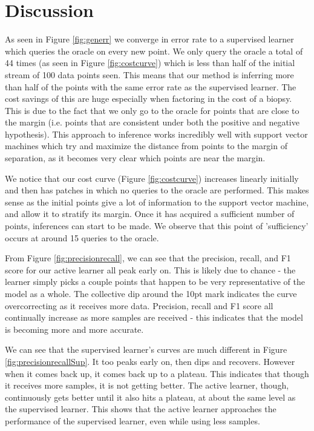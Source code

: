 \documentclass[12pt]{article}
\begin{document}
\section{Discussion}
As seen in Figure \ref{fig:generr} we converge in error rate to a supervised learner which queries the oracle on every new point. We only query the oracle a total of 44 times (as seen in Figure \ref{fig:costcurve}) which is less than half of the initial stream of 100 data points seen. This means that our method is inferring more than half of the points with the same error rate as the supervised learner. The cost savings of this are huge especially when factoring in the cost of a biopsy. This is due to the fact that we only go to the oracle for points that are close to the margin (i.e. points that are consistent under both the positive and negative hypothesis). This approach to inference works incredibly well with support vector machines which try and maximize the distance from points to the margin of separation, as it becomes very clear which points are near the margin.

We notice that our cost curve (Figure \ref{fig:costcurve}) increases linearly initially and then has patches in which no queries to the oracle are performed. This makes sense as the initial points give a lot of information to the support vector machine, and allow it to stratify its margin. Once it has acquired a sufficient number of points, inferences can start to be made. We observe that this point of 'sufficiency' occurs at around 15 queries to the oracle.

From Figure \ref{fig:precisionrecall}, we can see that the precision, recall, and F1 score for our active learner all peak early on. This is likely due to chance - the learner simply picks a couple points that happen to be very representative of the model as a whole. The collective dip around the 10pt mark indicates the curve overcorrecting as it receives more data. Precision, recall and F1 score all continually increase as more samples are received - this indicates that the model is becoming more and more accurate.

We can see that the supervised learner's curves are much different in Figure \ref{fig:precisionrecallSup}. It too peaks early on, then dips and recovers. However when it comes back up, it comes back up to a plateau. This indicates that though it receives more samples, it is not getting better. The active learner, though, continuously gets better until it also hits a plateau, at about the same level as the supervised learner. This shows that the active learner approaches the performance of the supervised learner, even while using less samples.
\end{document}
